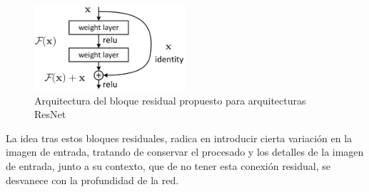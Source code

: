 \begin{itemize}
    \begin{figure}[!h]
        \centering
        \includegraphics[width=0.5\textwidth]{figuras/desarrollo teorico/bloque_residual.png}
        \caption{Arquitectura del bloque residual \cite{He2016} propuesto para arquitecturas ResNet}
        \label{fig:bloque_residual}
    \end{figure}
    
    La idea tras estos bloques residuales, radica en introducir cierta variación en la imagen de entrada, tratando de conservar el procesado y los detalles de la imagen de entrada, junto a su contexto, que de no tener esta conexión residual, se desvanece con la profundidad de la red.
    
    
\end{itemize}
